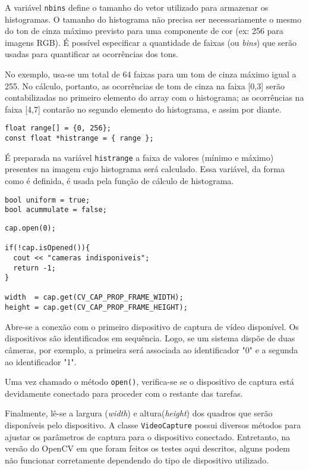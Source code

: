 \documentclass[11pt]{amsbook}
\begin{document}
A variável \texttt{nbins} define o tamanho do vetor utilizado para armazenar
os histogramas. O tamanho do histograma não precisa ser
necessariamente o mesmo do ton de cinza máximo previsto para uma
componente de cor (ex: 256 para imagens RGB). É possível especificar a
quantidade de faixas (ou \emph{bins}) que serão usadas para quantificar
as ocorrências dos tons.


No exemplo, usa-se um total de 64 faixas para um tom de cinza máximo
igual a 255. No cálculo, portanto, as ocorrências de tom de cinza na
faixa [0,3] serão contabilizadas no primeiro elemento do array
com o histograma; as ocorrências na faixa [4,7] contarão no
segundo elemento do histograma, e assim por diante.


\begin{verbatim}
float range[] = {0, 256};
const float *histrange = { range };
\end{verbatim}

É preparada na variável \texttt{histrange} a faixa de valores (mínimo e
máximo) presentes na imagem cujo histograma será calculado. Essa
variável, da forma como é definida, é usada pela função de cálculo de
histograma.


\begin{verbatim}
bool uniform = true;
bool acummulate = false;
\end{verbatim}

\begin{verbatim}
cap.open(0);

if(!cap.isOpened()){
  cout << "cameras indisponiveis";
  return -1;
}

width  = cap.get(CV_CAP_PROP_FRAME_WIDTH);
height = cap.get(CV_CAP_PROP_FRAME_HEIGHT);
\end{verbatim}

Abre-se a conexão com o primeiro dispositivo de captura de vídeo
disponível. Os dispositivos são identificados em sequência. Logo, se
um sistema dispõe de duas câmeras, por exemplo, a primeira será
associada ao identificador "0" e a segunda ao identificador "1".


Uma vez chamado o método \texttt{open()}, verifica-se se o dispositivo de
captura está devidamente conectado para proceder com o restante das
tarefas.


Finalmente, lê-se a largura (\emph{width}) e altura(\emph{height}) dos quadros
que serão disponíveis pelo dispositivo. A classe \texttt{VideoCapture} possui
diversos métodos para ajustar os parâmetros de captura para o
dispositivo conectado. Entretanto, na versão do OpenCV em que foram
feitos os testes aqui descritos, alguns podem não funcionar
corretamente dependendo do tipo de dispositivo utilizado.
\end{document}
